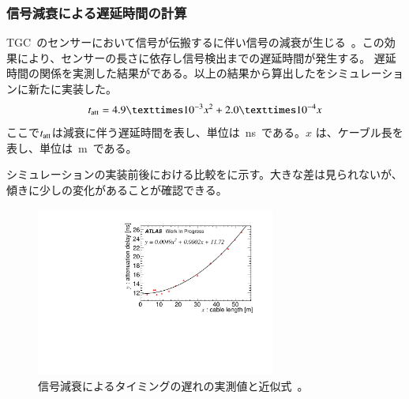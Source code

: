 \subsubsection{信号減衰による遅延時間の計算}
TGC~のセンサーにおいて信号が伝搬するに伴い信号の減衰が生じる~\cite{MT:04}。この効果により、センサーの長さに依存し信号検出までの遅延時間が発生する。
遅延時間の関係を実測した結果がである。以上の結果から算出したをシミュレーションに新たに実装した。
\begin{align}
    t_{\rm{att}} =4.9×10^{-3}x^2+2.0×10^{-4}x
     \label{eq:delay}
\end{align}
ここで$t_{\rm{att}}$は減衰に伴う遅延時間を表し、単位は~ns~である。$x$ は、ケーブル長を表し、単位は~m~である。

シミュレーションの実装前後における比較をに示す。大きな差は見られないが、傾きに少しの変化があることが確認できる。


\begin{figure}[H]
    \centering   
    \includegraphics[width=0.7\textwidth,page=1]{img/plot/attk.pdf}
    \caption[信号減衰によるタイミングの遅れの実測値と近似式]{信号減衰によるタイミングの遅れの実測値と近似式~\cite{MT:04}。}
    \label{fig:att0}
\end{figure}


